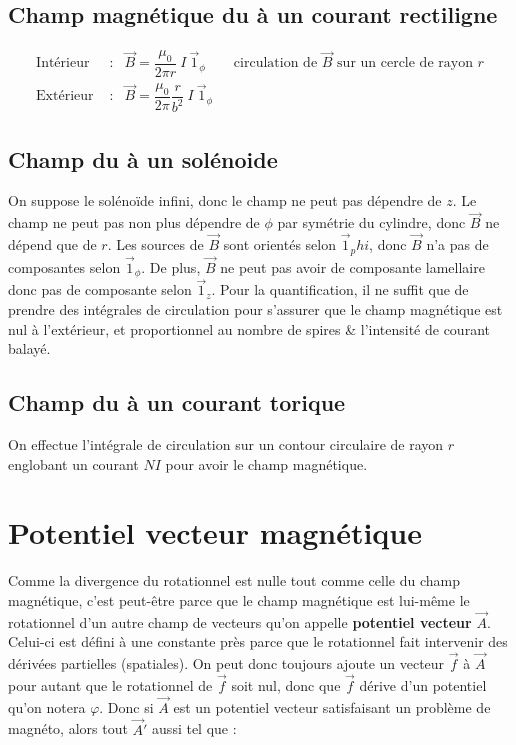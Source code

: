 \documentclass[12pt]{book}
\begin{document}
\subsection{Champ magnétique du à un courant rectiligne}
\begin{eqnarray*}
\text{Intérieur } &:& \vec{B} = \dfrac{\mu_0}{2\pi r} \ I\ \vec{1}_\phi \qquad \text{circulation de $\vec{B}$ sur un cercle de rayon $r$} \\
\text{Extérieur } &:& \vec{B} = \dfrac{\mu_0}{2\pi} \dfrac{r}{b^2}\ I\ \vec{1}_\phi
\end{eqnarray*}
\subsection{Champ du à un solénoide}
On suppose le solénoïde infini, donc le champ ne peut pas dépendre de $z$. Le champ ne peut pas non plus dépendre de $\phi$ par symétrie du cylindre, donc $\vec{B}$ ne dépend que de $r$. Les sources de $\vec{B}$ sont orientés selon  $\vec{1}_phi$, donc $\vec{B}$ n'a pas de composantes selon $\vec{1}_\phi$. De plus, $\vec{B}$ ne peut pas avoir de composante lamellaire donc pas de composante selon $\vec{1}_z$. Pour la quantification, il ne suffit que de prendre des intégrales de circulation pour s'assurer que le champ magnétique est nul à l'extérieur, et proportionnel au nombre de spires \& l'intensité de courant balayé.
\subsection{Champ du à un courant torique}
On effectue l'intégrale de circulation sur un contour circulaire de rayon $r$ englobant un courant $NI$ pour avoir le champ magnétique.

\section{Potentiel vecteur magnétique}
Comme la divergence du rotationnel est nulle tout comme celle du champ magnétique, c'est peut-être parce que le champ magnétique est lui-même le rotationnel d'un autre champ de vecteurs qu'on appelle \textbf{potentiel vecteur} $\vec{A}$. Celui-ci est défini à une constante près parce que le rotationnel fait intervenir des dérivées partielles (spatiales). On peut donc toujours ajoute un vecteur $\vec{f}$ à $\vec{A}$ pour autant que le rotationnel de $\vec{f}$ soit nul, donc que $\vec{f}$ dérive d'un potentiel qu'on notera $\varphi$. Donc si $\vec{A}$ est un potentiel vecteur satisfaisant un problème de magnéto, alors tout $\vec{A}'$ aussi tel que :
\end{document}
